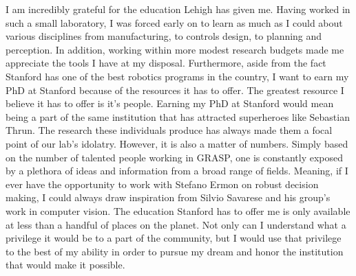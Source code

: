 \documentclass[12pt]{article}
\begin{document}
I am incredibly grateful for the education Lehigh has given me. Having worked
in such a small laboratory, I was forced early on to learn as much as I could
about various disciplines from manufacturing, to controls design, to planning
and perception. In addition, working within more modest research budgets made
me appreciate the tools I have at my disposal. Furthermore, aside from the fact
Stanford has one of the best robotics programs in the country, I want to earn
my PhD at Stanford because of the resources it has to offer. The greatest
resource I believe it has to offer is it's people. Earning my PhD at Stanford
would mean being a part of the same institution that has attracted superheroes
like Sebastian Thrun. The research these individuals produce has always made
them a focal point of our lab's idolatry. However, it is also a matter of
numbers.  Simply based on the number of talented people working in GRASP, one
is constantly exposed by a plethora of ideas and information from a broad range
of fields. Meaning, if I ever have the opportunity to work with Stefano Ermon
on robust decision making, I could always draw inspiration from Silvio Savarese
and his group's work in computer vision. The education Stanford has to offer me
is only available at less than a handful of places on the planet. Not only can
I understand what a privilege it would be to a part of the community, but I
would use that privilege to the best of my ability in order to pursue my dream
and honor the institution that would make it possible.
\end{document}
